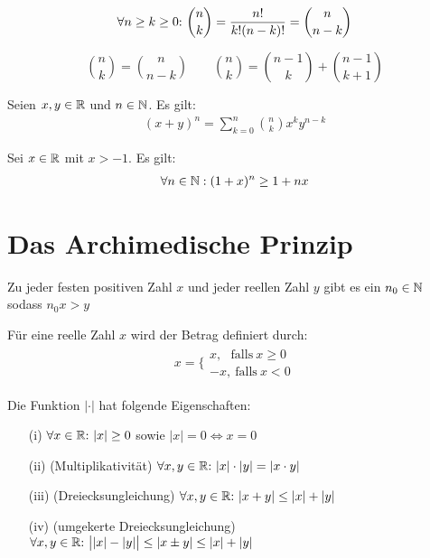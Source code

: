 \begin{frameddefn}
\begin{align*}
	\forall n \geq k \geq 0{:}\  {n\choose k} = \frac{n!}{k! (n-k)!} = {n\choose n-k}
\end{align*}
\end{frameddefn}

\begin{framedquest}
	\[
	{n\choose k} = {n\choose {n-k}}\qquad {n\choose k} = {{n-1}\choose k} + {{n-1}\choose {k+1}}
	\]
\end{framedquest}

\begin{framedthm}
	Seien $x,y \in \mathbb{R}$ und $n \in \mathbb{N}$. Es gilt:
	\begin{align*}
		(x+y)^n = \sum_{k=0}^{n} {n\choose k} x^k y^{n-k}
	\end{align*}
\end{framedthm}


\begin{framedthm}
	Sei $x\in \mathbb{R}$ mit $x > -1$. Es gilt:
	\begin{align*}
		\forall n \in \mathbb{N}: (1 + x)^n \geq 1 + nx
	\end{align*}
\end{framedthm}

\section{Das Archimedische Prinzip}


\begin{framedthm}
	Zu jeder festen positiven Zahl $x$ und jeder reellen Zahl $y$ gibt es ein $n_0 \in \mathbb{N}$ sodass $n_0 x > y$
\end{framedthm}

\begin{frameddefn}[Absolutbetrag]
	Für eine reelle Zahl $x$ wird der Betrag definiert durch:
	\begin{align*}
		x = \biggl\{\begin{array}{ll}
			x, \ \ \ \textrm{falls}\  x \geq 0 \\
			-x, \  \textrm{falls}\  x < 0
		\end{array}
	\end{align*}
\end{frameddefn}

\begin{framedthm}
	Die Funktion $|\cdot|$ hat folgende Eigenschaften:
	\begin{enumerate}
		\item[(i)] $\forall x \in \mathbb{R}{:}\  |x| \geq 0$ sowie $|x| = 0 \iff x = 0$
		\item [(ii)] (Multiplikativität) $\forall x,y \in \mathbb{R}{:}\  |x|\cdot|y| = |x\cdot y|$
		\item[(iii)] (Dreiecksungleichung) $\forall x,y \in \mathbb{R}{:}\  |x+y| \leq |x| + |y|$
		\item[(iv)] (umgekerte Dreiecksungleichung) $\forall x,y \in \mathbb{R}{:}\  \big||x| - |y|\big| \leq |x \pm y| \leq |x| + |y|$
	\end{enumerate}
\end{framedthm}


